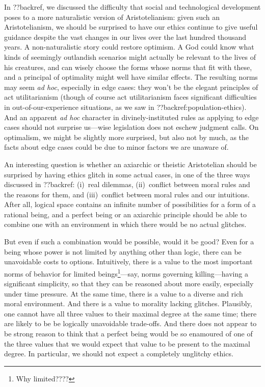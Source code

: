 In ??backref, we discussed the difficulty that social and technological development poses to a more naturalistic
version of Aristotelianism: given such an Aristotelianism, we should be surprised to have our ethics continue
to give useful guidance despite the vast changes in our lives over the last hundred thousand years. 
A non-naturalistic story could restore optimism. A God could 
know what kinds of seemingly outlandish scenarios might
actually be relevant to the lives of his creatures, and can wisely choose the forms whose norms that fit with these,
and a principal of optimality might well have similar effects. The resulting norms may 
seem \textit{ad hoc}, especially in edge cases: they won't be the elegant principles of act utilitarianism (though of course act utilitarianism
faces significant difficulties in out-of-our-experience situations, as we saw in ??backref:population-ethics). And an apparent
\textit{ad hoc} character in divinely-instituted rules as applying to edge cases should not surprise us---wise legislation does not eschew 
judgment calls. On optimalism, we might be slightly more surprised, but also not by much, as the facts about edge cases
could be due to minor factors we are unaware of.

An interesting question is whether an axiarchic or theistic Aristotelian should be surprised by having ethics glitch in some actual cases, in one of 
the three ways discussed in ??backref: (i)~real dilemmas, (ii)~conflict between moral rules and the reasons for them, and (iii)~conflict between
moral rules and our intuitions. After all, logical space contains an infinite number of possibilities for a form of a rational 
being, and a perfect being or an axiarchic principle should be able to combine one with an environment in which there would be no actual glitches. 

But even if such a combination would be possible, would it be good? Even for a being
whose power is not limited by anything other than logic, there can be unavoidable costs to options. Intuitively, there is a value to
the most important norms of behavior for limited beings\footnote{Why limited????}---say, norms governing killing---having a significant simplicity, so that
they can be reasoned about more easily, especially under time pressure.  At the same
time, there is a value to a diverse and rich moral environment. And there is a value to morality lacking glitches. Plausibly,
one cannot have all three values to their maximal degree at the same time; there are likely to be be logically unavoidable trade-offs. 
And there does not appear to be strong reason to think that a perfect being would be so enamoured of one of the three values that
we would expect that value to be present to the maximal degree. In particular, we should not expect a completely unglitchy ethics.

